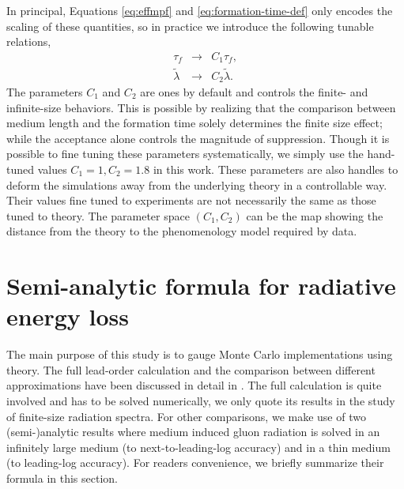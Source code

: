 \documentclass[aps, prc, reprint, amsmath, groupedaddress, nofootinbib]{revtex4-1}
\begin{document}
In principal, Equations \ref{eq:effmpf} and \ref{eq:formation-time-def} only encodes the scaling of these quantities, so in practice we introduce the following tunable relations,
\begin{eqnarray}\label{eq:tune}
\nonumber
\tau_f & \rightarrow & C_1 \tau_f, \\
\tilde{\lambda} & \rightarrow & C_2 \tilde{\lambda}.
\end{eqnarray}
The parameters $C_1$ and $C_2$ are ones by default and controls the finite- and infinite-size behaviors. 
This is possible by realizing that the comparison between medium length and the formation time solely determines the finite size effect; while the acceptance alone controls the magnitude of suppression.
Though it is possible to fine tuning these parameters systematically, we simply use the hand-tuned values $C_1 = 1, C_2 = 1.8$ in this work.
These parameters are also handles to deform the simulations away from the underlying theory in a controllable way.
Their values fine tuned to experiments are not necessarily the same as those tuned to theory. 
The parameter space $(C_1, C_2)$ can be the map showing the distance from the theory to the phenomenology model required by data.


\section{Semi-analytic formula for radiative energy loss}\label{section:Theo}
The main purpose of this study is to gauge Monte Carlo implementations using theory.
The full lead-order calculation and the comparison between different approximations have been discussed in detail in \cite{CaronHuot:2008uh}.
The full calculation is quite involved and has to be solved numerically, we only quote its results in the study of finite-size radiation spectra.
For other comparisons, we make use of two (semi-)analytic results where medium induced gluon radiation is solved in an infinitely large medium (to next-to-leading-log accuracy) and in a thin medium (to leading-log accuracy).
For readers convenience, we briefly summarize their formula in this section.
\end{document}
